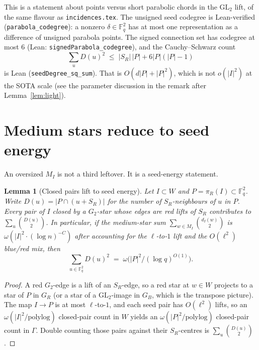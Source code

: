 \documentclass[11pt]{article}
\newtheorem{lemma}[theorem]{Lemma}
\theoremstyle{definition}
\newcommand{\F}{\mathbb{F}}
\newcommand{\bin}[2]{\binom{#1}{#2}}
\begin{document}
This is a statement about points versus short parabolic chords in the $\mathrm{GL}_2$ lift, of the same flavour as \texttt{incidences.tex}.
The unsigned seed codegree is Lean-verified (\texttt{parabola\_codegree}): a nonzero $\delta\in\F_q^{2}$ has at most one representation as a difference of unsigned parabola points.
The signed connection set has codegree at most $6$
(Lean: \texttt{signedParabola\_codegree}), and the Cauchy--Schwarz count
\[
  \sum_u D(u)^{2}\;\le\;|S_R|\,|P|+6|P|(|P|-1)
\]
is Lean (\texttt{seedDegree\_sq\_sum}).
That is $O(d|P|+|P|^{2})$, which is not $o(|I|^{2})$ at the SOTA scale
(see the parameter discussion in the remark after Lemma~\ref{lem:light}).

\section{Medium stars reduce to seed energy}

An oversized $M_I$ is not a third leftover. It is a seed-energy statement.

\begin{lemma}[Closed pairs lift to seed energy]\label{lem:med-seed}
Let $I\subset W$ and $P=\pi_R(I)\subset\F_q^{2}$.
Write $D(u)=|P\cap(u+S_R)|$ for the number of $S_R$-neighbours of $u$ in $P$.
Every pair of $I$ closed by a $G_2$-star whose edges are red lifts of $S_R$
contributes to $\sum_u\bin{D(u)}{2}$.
In particular, if the medium-star sum $\sum_{w\in M_I}\bin{d_I(w)}{2}$ is
$\omega(|I|^{2}\cdot(\log n)^{-C})$ after accounting for the $\ell$-to-$1$
lift and the $O(\ell^{2})$ blue/red mix, then
\[
  \sum_{u\in\F_q^{2}}D(u)^{2}
  \;=\;
  \omega\bigl(|P|^{2}/(\log q)^{O(1)}\bigr).
\]
\end{lemma}

\begin{proof}
A red $G_2$-edge is a lift of an $S_R$-edge, so a red star at $w\in W$
projects to a star of $P$ in $G_R$ (or a star of a $\mathrm{GL}_2$-image in
$G_B$, which is the transpose picture).
The map $I\to P$ is at most $\ell$-to-$1$, and each seed pair has
$O(\ell^{2})$ lifts, so an $\omega(|I|^{2}/\mathrm{polylog})$ closed-pair count
in $W$ yields an $\omega(|P|^{2}/\mathrm{polylog})$ closed-pair count in
$\Gamma$.
Double counting those pairs against their $S_R$-centres is
$\sum_u\bin{D(u)}{2}$.
\end{proof}
\end{document}
